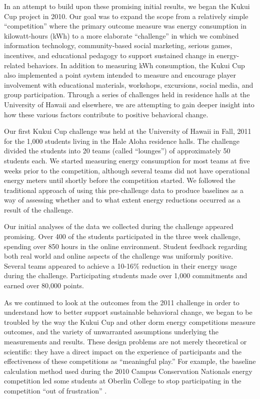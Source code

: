 \documentclass[jou]{apa} %
\begin{document}
In an attempt to build upon these promising initial results, we began the Kukui Cup
project in 2010.  Our goal was to expand the scope from a relatively simple ``competition''
where the primary outcome measure was energy consumption in kilowatt-hours (kWh) to a more
elaborate ``challenge'' in which we combined information technology, community-based social
marketing, serious games, incentives, and educational pedagogy to support sustained change
in energy-related behaviors. In addition to measuring kWh consumption, the Kukui Cup also
implemented a point system intended to measure and encourage player involvement with
educational materials, workshops, excursions, social media, and group participation.
Through a series of challenges held in residence halls at the University of Hawaii and
elsewhere, we are attempting to gain deeper insight into how these various factors
contribute to positive behavioral change.

Our first Kukui Cup challenge was held at the University of Hawaii in Fall, 2011 for the
1,000 students living in the Hale Aloha residence halls. The challenge divided the
students into 20 teams (called ``lounges'') of approximately 50 students each.  We started
measuring energy consumption for most teams at five weeks prior to the competition,
although several teams did not have operational energy meters until shortly before the
competition started. We followed the traditional approach of using this pre-challenge data
to produce baselines as a way of assessing whether and to what extent energy reductions
occurred as a result of the challenge.

Our initial analyses of the data we collected during the challenge appeared promising.
Over 400 of the students participated in the three week challenge, spending over 850 hours
in the online environment.  Student feedback regarding both real world and online aspects
of the challenge was uniformly positive.  Several teams appeared to achieve a 10-16\%
reduction in their energy usage during the challenge.  Participating students made over
1,000 commitments and earned over 80,000 points.

As we continued to look at the outcomes from the 2011 challenge in order to understand how
to better support sustainable behavioral change, we began to be troubled by the way the
Kukui Cup and other dorm energy competitions measure outcomes, and the variety of
unwarranted assumptions underlying the measurements and results.  These design problems
are not merely theoretical or scientific: they have a direct impact on the experience of
participants and the effectiveness of these competitions as ``meaningful play.''  For
example, the baseline calculation method used during the 2010 Campus Conservation
Nationals energy competition led some students at Oberlin College to stop participating in
the competition ``out of frustration'' \cite{Willens2010}.
\end{document}
